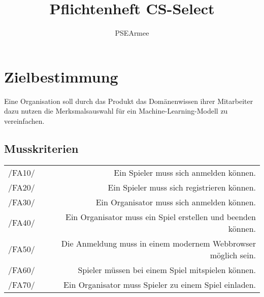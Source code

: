 \documentclass[a4paper]{scrreprt}
\begin{document}
 
\title{Pflichtenheft CS-Select}
\author{PSEArmee}
\maketitle
 
\tableofcontents
 
\chapter{Zielbestimmung}
Eine Organisation soll durch das \Gls{Produkt} das Domänenwissen ihrer Mitarbeiter dazu nutzen die Merksmalsauswahl für ein Machine-Learning-Modell zu vereinfachen.
\section{Musskriterien}
\begin{tabular}{ l | r}
/FA10/ & Ein \Gls{Spieler} muss sich anmelden können. \\ 
/FA20/ & Ein \Gls{Spieler} muss sich registrieren können. \\
/FA30/ & Ein \Gls{Organisator} muss sich anmelden können. \\
/FA40/ & Ein \Gls{Organisator} muss ein \Gls{Spiel} erstellen und beenden können. \\
/FA50/ & Die Anmeldung muss in einem modernem \Gls{Webbrowser} möglich sein. \\
/FA60/ & \Gls{Spieler} müssen bei einem \Gls{Spiel} mitspielen können. \\
/FA70/ & Ein \Gls{Organisator} muss \Gls{Spieler} zu einem \Gls{Spiel} einladen. \\
\end{tabular} 
\end{document}
